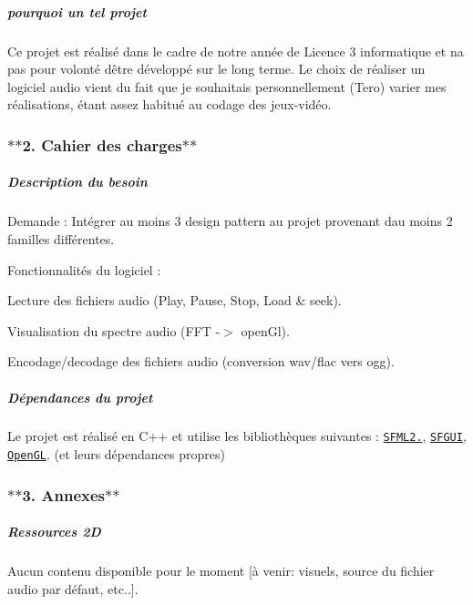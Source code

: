 \subparagraph*{pourquoi un tel projet}

Ce projet est réalisé dans le cadre de notre année de Licence 3 informatique et n\textquotesingle{}a pas pour volonté d\textquotesingle{}être développé sur le long terme. Le choix de réaliser un logiciel audio vient du fait que je souhaitais personnellement (Tero) varier mes réalisations, étant assez habitué au codage des jeux-\/vidéo.

\subsubsection*{$\ast$$\ast$2. Cahier des charges$\ast$$\ast$}

\subparagraph*{Description du besoin}

Demande \+: Intégrer au moins 3 design pattern au projet provenant d\textquotesingle{}au moins 2 familles différentes.

Fonctionnalités du logiciel \+:
\begin{DoxyItemize}
\item Lecture des fichiers audio (Play, Pause, Stop, Load \& seek).
\item Visualisation du spectre audio (F\+FT -\/$>$ open\+Gl).
\item Encodage/decodage des fichiers audio (conversion wav/flac vers ogg).
\end{DoxyItemize}

\subparagraph*{Dépendances du projet}

Le projet est réalisé en C++ et utilise les bibliothèques suivantes \+: \href{http://www.sfml-dev.org/index-fr.php}{\tt S\+F\+M\+L2.}, \href{http://sfgui.sfml-dev.de/p/}{\tt S\+F\+G\+UI}, \href{http://www.opengl.org/}{\tt Open\+GL}. (et leurs dépendances propres)

\subsubsection*{$\ast$$\ast$3. Annexes$\ast$$\ast$}

\subparagraph*{Ressources 2D}

Aucun contenu disponible pour le moment \mbox{[}à venir\+: visuels, source du fichier audio par défaut, etc..\mbox{]}. 